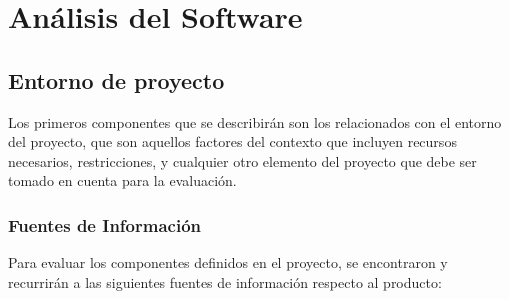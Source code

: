 \chapter{Análisis del Software}

\section{Entorno de proyecto}
Los primeros componentes que se describirán son los relacionados con el entorno
del proyecto, que son aquellos factores del contexto que incluyen recursos
necesarios, restricciones, y cualquier otro elemento del proyecto que debe ser
tomado en cuenta para la evaluación.

\subsection{Fuentes de Información}
Para evaluar los componentes definidos en el proyecto, se encontraron
y recurrirán a las siguientes fuentes de información respecto al producto:

